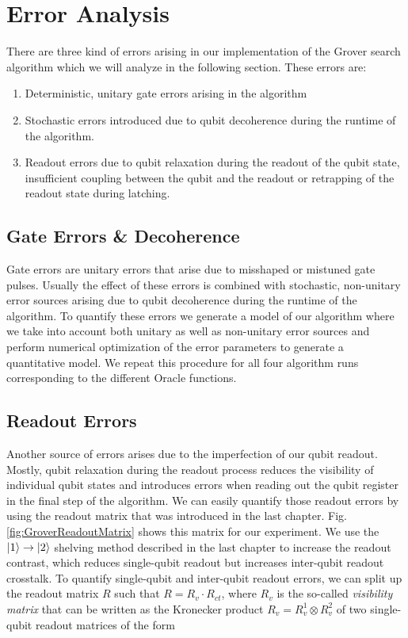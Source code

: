 \section{Error Analysis}

There are three kind of errors arising in our implementation of the Grover search algorithm which we will analyze in the following section. These errors are:

\begin{enumerate}
	\item Deterministic, unitary gate errors arising in the algorithm
	\item Stochastic errors introduced due to qubit decoherence during the runtime of the algorithm.
	\item Readout errors due to qubit relaxation during the readout of the qubit state, insufficient coupling between the qubit and the readout or retrapping of the readout state during latching.
\end{enumerate}

\subsection{Gate Errors \& Decoherence}

Gate errors are unitary errors that arise due to misshaped or mistuned gate pulses. Usually the effect of these errors is combined with stochastic, non-unitary error sources arising due to qubit decoherence during the runtime of the algorithm. To quantify these errors we generate a model of our algorithm where we take into account both unitary as well as non-unitary error sources and perform numerical optimization of the error parameters to generate a quantitative model. We repeat this procedure for all four algorithm runs corresponding to the different Oracle functions.

\subsection{Readout Errors}

Another source of errors arises due to the imperfection of our qubit readout. Mostly, qubit relaxation during the readout process reduces the visibility of individual qubit states and introduces errors when reading out the qubit register in the final step of the algorithm. We can easily quantify those readout errors by using the readout matrix that was introduced in the last chapter. Fig. \ref{fig:GroverReadoutMatrix} shows this matrix for our experiment. We use the $\left| 1 \right>\to\left| 2 \right>$ shelving method described in the last chapter to increase the readout contrast, which reduces single-qubit readout but increases inter-qubit readout crosstalk. To quantify single-qubit and inter-qubit readout errors, we can split up the readout matrix $R$ such that $R=R_{v}\cdot R_{ct}$, where $R_{v}$ is the so-called {\it visibility matrix} that can be written as the Kronecker product $R_{v} = R_{v}^1 \otimes R_{v}^2$ of two single-qubit readout matrices of the form

